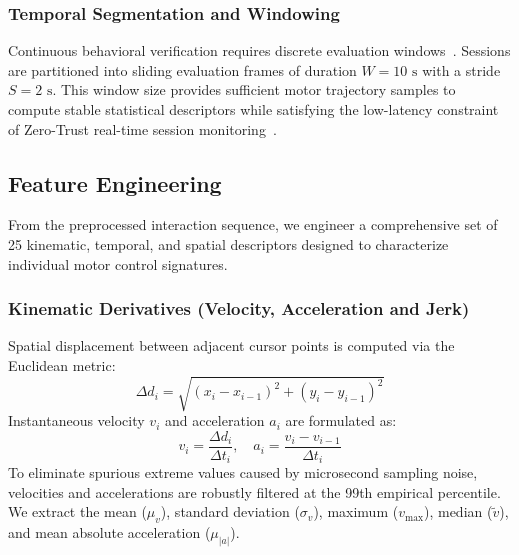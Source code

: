 \documentclass[10pt,journal,compsoc]{IEEEtran}
\begin{document}
\subsubsection{Temporal Segmentation and Windowing}
Continuous behavioral verification requires discrete evaluation windows~\cite{zheng2023continuous}. Sessions are partitioned into sliding evaluation frames of duration $W = 10\text{ s}$ with a stride $S = 2\text{ s}$. This window size provides sufficient motor trajectory samples to compute stable statistical descriptors while satisfying the low-latency constraint of Zero-Trust real-time session monitoring~\cite{roy2023optimal, abaza2024vision}.

\subsection{Feature Engineering}
From the preprocessed interaction sequence, we engineer a comprehensive set of 25 kinematic, temporal, and spatial descriptors designed to characterize individual motor control signatures.

\subsubsection{Kinematic Derivatives (Velocity, Acceleration and Jerk)}
Spatial displacement between adjacent cursor points is computed via the Euclidean metric:
\begin{equation}
\Delta d_i = \sqrt{(x_i - x_{i-1})^2 + (y_i - y_{i-1})^2}
\end{equation}
Instantaneous velocity $v_i$ and acceleration $a_i$ are formulated as:
\begin{equation}
v_i = \frac{\Delta d_i}{\Delta t_i}, \quad a_i = \frac{v_i - v_{i-1}}{\Delta t_i}
\end{equation}
To eliminate spurious extreme values caused by microsecond sampling noise, velocities and accelerations are robustly filtered at the 99th empirical percentile. We extract the mean ($\mu_v$), standard deviation ($\sigma_v$), maximum ($v_{\max}$), median ($\tilde{v}$), and mean absolute acceleration ($\mu_{|a|}$).
\end{document}
